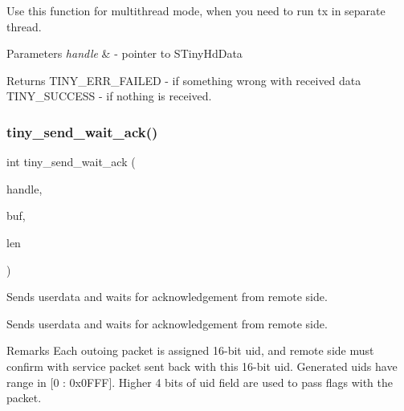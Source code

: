 Use this function for multithread mode, when you need to run tx in separate thread.


\begin{DoxyParams}{Parameters}
{\em handle} & -\/ pointer to S\+Tiny\+Hd\+Data \\
\hline
\end{DoxyParams}
\begin{DoxyReturn}{Returns}
T\+I\+N\+Y\+\_\+\+E\+R\+R\+\_\+\+F\+A\+I\+L\+ED -\/ if something wrong with received data T\+I\+N\+Y\+\_\+\+S\+U\+C\+C\+E\+SS -\/ if nothing is received. 
\end{DoxyReturn}
\mbox{\label{group__HALF__DUPLEX__API_ga5aad8dcb504b80bac923496f2686a6d6}} 
\subsubsection{\texorpdfstring{tiny\+\_\+send\+\_\+wait\+\_\+ack()}{tiny\_send\_wait\_ack()}}
{\footnotesize\ttfamily int tiny\+\_\+send\+\_\+wait\+\_\+ack (\begin{DoxyParamCaption}\item[{\hyperlink{tiny__hd_8h_af9f81ad129b754a780dfca5dcd7f7cf9}{S\+Tiny\+Hd\+Data} $\ast$}]{handle,  }\item[{void $\ast$}]{buf,  }\item[{uint16\+\_\+t}]{len }\end{DoxyParamCaption})}



Sends userdata and waits for acknowledgement from remote side. 

Sends userdata and waits for acknowledgement from remote side.

\begin{DoxyRemark}{Remarks}
Each outoing packet is assigned 16-\/bit uid, and remote side must confirm with service packet sent back with this 16-\/bit uid. Generated uids have range in \mbox{[}0 \+: 0x0\+F\+FF\mbox{]}. Higher 4 bits of uid field are used to pass flags with the packet.
\end{DoxyRemark}

